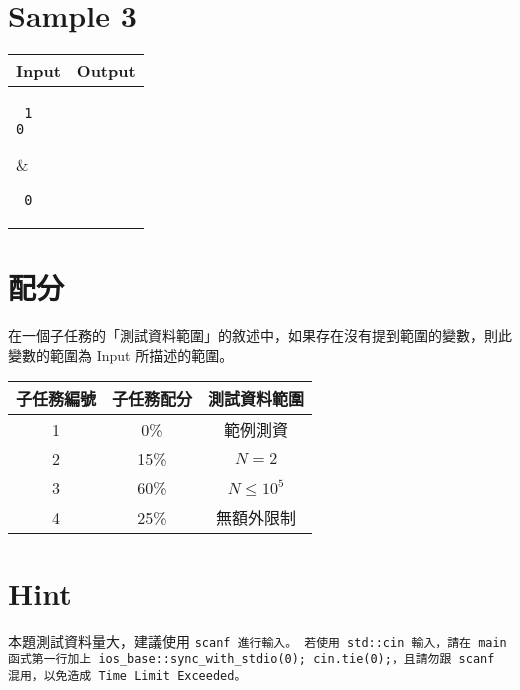 \documentclass[11pt,a4paper]{article}
\begin{document}
\newpage
\section*{Sample 3}
\begin{longtable}[!h]{|p{}|p{}|}
\hline
\textbf {Input}	& \textbf {Output} \\
\hline
\parbox[t]{0.5\textwidth} %
{ \tt
1 \\
0 \\
} &
\parbox[t]{0.5\textwidth}
{ \tt
0 \\
} \\
\hline
\end{longtable}

\section*{配分}

在一個子任務的「測試資料範圍」的敘述中，如果存在沒有提到範圍的變數，則此變數的範圍為 Input 所描述的範圍。

\begin{center}
 \begin{tabular}{||c c c||} 
 \hline
 子任務編號 & 子任務配分 & 測試資料範圍 \\  
 \hline\hline
 1 & 0\% & 範例測資 \\ 
 \hline
 2 & 15\% & $N = 2$ \\
 \hline
 3 & 60\% & $N \le 10^5$ \\
 \hline
 4 & 25\% & 無額外限制 \\
 \hline
\end{tabular}
\end{center}

\section*{Hint}
本題測試資料量大，建議使用 \tt{scanf} 進行輸入。
若使用 \tt{std::cin} 輸入，請在 \tt{main} 函式第一行加上 \tt{ios\_base::sync\_with\_stdio(0);} \tt{cin.tie(0);}，且請勿跟 \tt{scanf} 混用，以免造成 Time Limit Exceeded。
\end{document}
